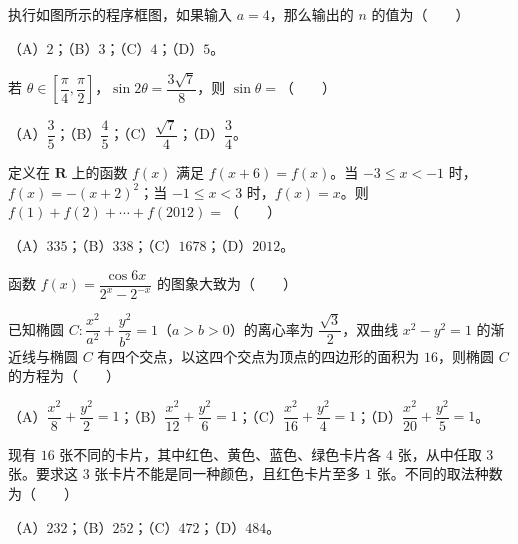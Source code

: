 \begin{question}
执行如图所示的程序框图，如果输入 $a=4$，那么输出的 $n$ 的值为\mbox{（　　）}
\nopagebreak[4]
\begin{center}\end{center}
\nopagebreak[4]
（A）$2$；（B）$3$；（C）$4$；（D）$5$。

\end{question}
\begin{question}
若 $\theta\in\left[\dfrac\pi4,\dfrac\pi2\right]$，$\sin2\theta=\dfrac{3\sqrt7}8$，则 $\sin\theta=$\mbox{（　　）}

（A）$\dfrac35$；（B）$\dfrac45$；（C）$\dfrac{\sqrt7}4$；（D）$\dfrac34$。

\end{question}
\begin{question}
定义在 $\mathbf R$ 上的函数 $f(x)$ 满足 $f(x+6)=f(x)$。当 $-3\leqslant x<-1$ 时，$f(x)=-(x+2)^2$；当 $-1\leqslant x<3$ 时，$f(x)=x$。则 $f(1)+f(2)+\cdots+f(2012)=$\mbox{（　　）}

（A）$335$；（B）$338$；（C）$1678$；（D）$2012$。

\Needspace{0.4\textheight}
\end{question}
\begin{question}
函数 $f(x)=\dfrac{\cos6x}{2^x-2^{-x}}$ 的图象大致为\mbox{（　　）}
\nopagebreak[4]
\begin{center}\end{center}
\nopagebreak[4]
\end{question}
\begin{question}
已知椭圆 $C:\dfrac{x^2}{a^2}+\dfrac{y^2}{b^2}=1$（$a>b>0$）的离心率为 $\dfrac{\sqrt3}2$，双曲线 $x^2-y^2=1$ 的渐近线与椭圆 $C$ 有四个交点，以这四个交点为顶点的四边形的面积为 $16$，则椭圆 $C$ 的方程为\mbox{（　　）}

（A）$\dfrac{x^2}8+\dfrac{y^2}2=1$；（B）$\dfrac{x^2}{12}+\dfrac{y^2}6=1$；（C）$\dfrac{x^2}{16}+\dfrac{y^2}4=1$；（D）$\dfrac{x^2}{20}+\dfrac{y^2}5=1$。

\end{question}
\begin{question}
现有 $16$ 张不同的卡片，其中红色、黄色、蓝色、绿色卡片各 $4$ 张，从中任取 $3$ 张。要求这 $3$ 张卡片不能是同一种颜色，且红色卡片至多 $1$ 张。不同的取法种数为\mbox{（　　）}

（A）$232$；（B）$252$；（C）$472$；（D）$484$。

\end{question}
